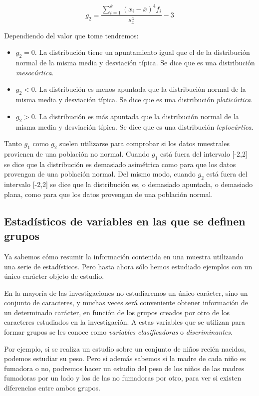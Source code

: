 \[g_2=\frac{\sum_{i=1}^{k}(x_i-\overline{x})^{4}f_i}{s_x^{4}}-3\]

Dependiendo del valor que tome tendremos:

\begin{itemize}
  \item $g_2=0$. La distribución tiene un apuntamiento igual que el de la distribución normal de la misma
  media y desviación típica. Se dice que es una distribución \emph{mesocúrtica}.
  \item $g_2<0$. La distribución es menos apuntada que la distribución normal de la misma
  media y desviación típica. Se dice que es una distribución \emph{platicúrtica}.
  \item $g_2>0$. La distribución es más apuntada que la distribución normal de la misma
  media y desviación típica. Se dice que es una distribución \emph{leptocúrtica}.
\end{itemize}

Tanto $g_1$ como $g_2$ suelen utilizarse para comprobar si los datos
muestrales provienen de una población no normal. Cuando $g_1$  está
fuera del intervalo [-2,2] se dice que la distribución es demasiado
asimétrica como para que los datos provengan de una población
normal. Del mismo modo, cuando $g_2$ está fuera del intervalo [-2,2]
se dice que la distribución es, o demasiado apuntada, o demasiado
plana, como para que los datos provengan de una población normal.

\subsection{Estadísticos de variables en las que se definen grupos}
Ya sabemos cómo resumir la información contenida en una muestra
utilizando una serie de estadísticos. Pero hasta ahora sólo hemos
estudiado ejemplos con un único carácter objeto de estudio.

En la mayoría de las investigaciones no estudiaremos un único
carácter, sino un conjunto de caracteres, y muchas veces será
conveniente obtener información de un determinado carácter, en
función de los grupos creados por otro de los caracteres estudiados
en la investigación. A estas variables que se utilizan para formar
grupos se les conoce como \emph{variables clasificadoras} o
\emph{discriminantes}.

Por ejemplo, si se realiza un estudio sobre un conjunto de niños
recién nacidos, podemos estudiar su peso. Pero si además sabemos si
la madre de cada niño es fumadora o no, podremos hacer un estudio
del peso de los niños de las madres fumadoras por un lado y los de
las no fumadoras por otro, para ver si existen diferencias entre
ambos grupos.


